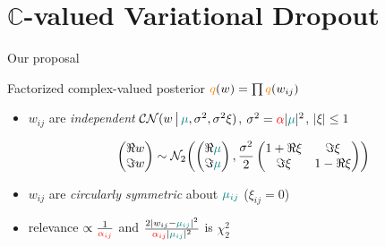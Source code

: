 \documentclass{beamer}
\newcommand{\cplx}{\mathbb{C}}
\begin{document}


\section{$\cplx$-valued Variational Dropout} %
\label{sec:extension_to_complex_parameters}

\begin{frame}[c]{\insertsection}{Our proposal}

  \medskip
  Factorized complex-valued posterior $
    {\color{orange} q}(w) = \prod {\color{orange} q}(w_{ij})
  $
  \begin{itemize}
    \item $w_{ij}$ are \emph{independent} $
      \mathcal{CN}(
        w\,\big\vert\,
        {\color{teal} \mu},
        \sigma^2,
        \sigma^2 \xi
      )
    $, $
      \sigma^2
        = {\color{red} \alpha} \lvert {\color{teal} \mu} \rvert^2
    $, $\lvert \xi \rvert \leq 1$

    $$
    \begin{pmatrix}
      \Re w \\ \Im w
    \end{pmatrix}
      \sim \mathcal{N}_{2}\biggl(
        \begin{pmatrix}
          \Re {\color{teal} \mu} \\ \Im {\color{teal} \mu}
        \end{pmatrix},
        \frac{\sigma^2}2
          \begin{pmatrix}
            1 + \Re{\xi} & \Im{\xi} \\
            \Im{\xi} & 1 - \Re{\xi}
          \end{pmatrix}
      \biggr)
      $$

    \pause
    \medskip
    \item $w_{ij}$ are \emph{circularly symmetric} about ${\color{teal} \mu_{ij}}$
      ($\xi_{ij} = 0$)

    \medskip
    \item relevance $
      \propto \frac1{{\color{red} \alpha_{ij}}}
    $ and $
      \tfrac{2 \lvert w_{ij} - {\color{teal} \mu_{ij}} \rvert^2}
            {{\color{red} \alpha_{ij}} \lvert {\color{teal} \mu_{ij}} \rvert^2}
    $ is $\chi^2_2$
  \end{itemize}


\end{frame}
\end{document}
